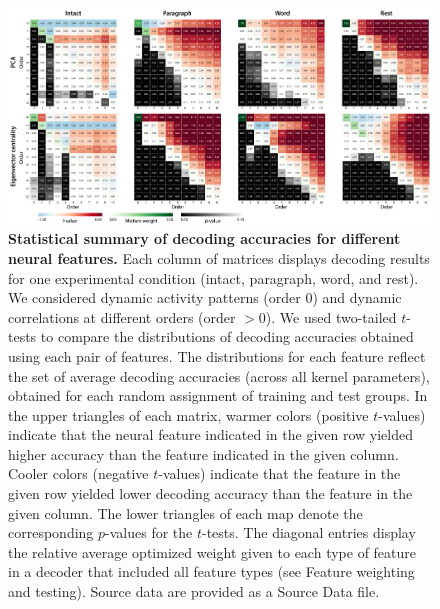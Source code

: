 \documentclass[english]{article}
\begin{document}
\begin{figure}[tp]
\centering
\includegraphics[width=1\textwidth]{figs/stats_heatmaps}
\caption{\textbf{Statistical summary of decoding accuracies for
     different neural features.}  Each column of matrices displays decoding
  results for one experimental condition (intact, paragraph, word, and
  rest).  We considered dynamic activity patterns (order 0) and
  dynamic correlations at different orders (order $> 0$).  We used
  two-tailed $t$-tests to compare the
  distributions of decoding accuracies obtained using each pair of
  features.  The distributions for each feature reflect the set of
  average decoding accuracies (across all kernel parameters), obtained
  for each random assignment of training and test groups.
  In the upper triangles of each matrix, warmer colors (positive $t$-values) indicate that the
  neural feature indicated in the given row yielded higher accuracy than the
  feature indicated in the given column.  Cooler colors (negative
  $t$-values) indicate that
  the feature in the given row yielded lower decoding accuracy than
  the feature in the given column.  The lower triangles of each map
  denote the corresponding $p$-values for the $t$-tests.  The diagonal
  entries display the relative average optimized weight given to each type of feature in
  a decoder that included all feature types (see Feature
    weighting and testing). Source data are provided as a Source Data file.}
\label{fig:ttests}
\end{figure}
\end{document}
